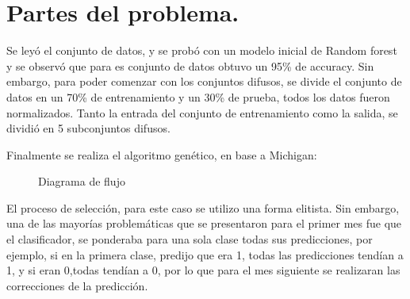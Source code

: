 \documentclass{article}
\begin{document}
\section{Partes del problema.}
Se leyó el conjunto de datos, y se probó con un modelo inicial de Random forest y se observó que para es conjunto de datos obtuvo un 95\% de accuracy.
Sin embargo, para poder comenzar con los conjuntos difusos, se divide el conjunto de datos en un 70\% de entrenamiento y un 30\% de prueba, todos los datos fueron normalizados.
Tanto la entrada del conjunto de entrenamiento como la salida, se dividió en 5 subconjuntos difusos. 

Finalmente se realiza el algoritmo genético, en base a Michigan:
\begin{figure}[H]
    \caption{Diagrama de flujo}
\end{figure}
El proceso de selección, para este caso se utilizo una forma elitista.
Sin embargo, una de las mayorías problemáticas que se presentaron para el primer mes fue que el clasificador, se ponderaba para una sola clase todas sus predicciones, por ejemplo, si en la primera clase, predijo que era 1, todas las predicciones tendían a 1, y si eran 0,todas tendían a 0, por lo que para el mes siguiente se realizaran las correcciones de la predicción.


\end{document}
